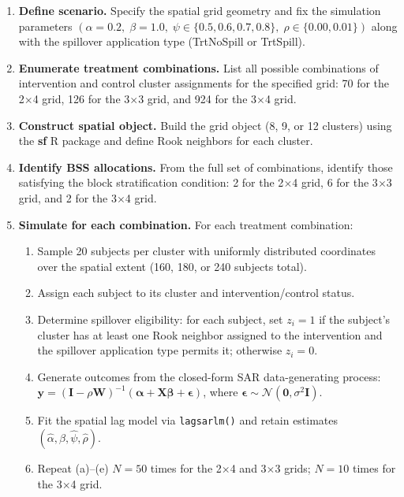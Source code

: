\documentclass{article}[11pt]
\begin{document}
\begin{enumerate}
    \item\label{AppStep:Define} \textbf{Define scenario.} Specify the spatial grid geometry and fix the simulation parameters $(\alpha = 0.2,\; \beta = 1.0,\; \psi \in \{0.5, 0.6, 0.7, 0.8\},\; \rho \in \{0.00, 0.01\})$ along with the spillover application type (TrtNoSpill or TrtSpill).

    \item \textbf{Enumerate treatment combinations.} List all possible combinations of intervention and control cluster assignments for the specified grid: 70 for the 2$\times$4 grid, 126 for the 3$\times$3 grid, and 924 for the 3$\times$4 grid.

    \item \textbf{Construct spatial object.} Build the grid object (8, 9, or 12 clusters) using the \textbf{sf} R package\cite{pebesma_simple_2018} and define Rook neighbors for each cluster.

    \item \textbf{Identify BSS allocations.} From the full set of combinations, identify those satisfying the block stratification condition: 2 for the 2$\times$4 grid, 6 for the 3$\times$3 grid, and 2 for the 3$\times$4 grid.

    \item\label{AppStep:Sim} \textbf{Simulate for each combination.} For each treatment combination:
    \begin{enumerate}
        \item Sample 20 subjects per cluster with uniformly distributed coordinates over the spatial extent (160, 180, or 240 subjects total).
        \item Assign each subject to its cluster and intervention/control status.
        \item Determine spillover eligibility: for each subject, set $z_i = 1$ if the subject's cluster has at least one Rook neighbor assigned to the intervention and the spillover application type permits it; otherwise $z_i = 0$.
        \item Generate outcomes from the closed-form SAR data-generating process: $\mathbf{y} = (\mathbf{I} - \rho\mathbf{W})^{-1}(\boldsymbol\alpha + \mathbf{X}\boldsymbol\beta + \boldsymbol\epsilon)$, where $\boldsymbol\epsilon \sim \mathcal{N}(\mathbf{0}, \sigma^2\mathbf{I})$.
        \item Fit the spatial lag model via \texttt{lagsarlm()} and retain estimates $(\hat\alpha, \hat\beta, \hat\psi, \hat\rho)$.
        \item Repeat (a)--(e) $N = 50$ times for the 2$\times$4 and 3$\times$3 grids; $N = 10$ times for the 3$\times$4 grid.
    \end{enumerate}


\end{enumerate}
\end{document}
